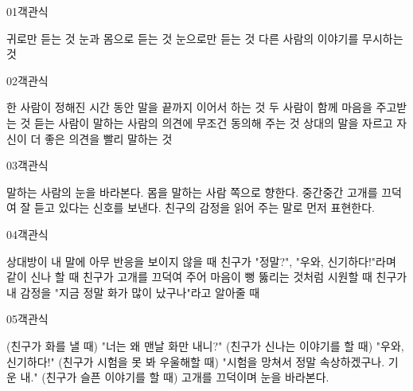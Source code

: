 \documentclass[fs12,seriesSau]{korfarm-base}
\begin{document}
\begin{kfQBlock}{01}{객관식}
\begin{kfChoices}
\kfChoice 귀로만 듣는 것
\kfChoice 눈과 몸으로 듣는 것
\kfChoice 눈으로만 듣는 것
\kfChoice 다른 사람의 이야기를 무시하는 것
\end{kfChoices}
\end{kfQBlock}
\begin{kfQBlock}{02}{객관식}
\begin{kfChoices}
\kfChoice 한 사람이 정해진 시간 동안 말을 끝까지 이어서 하는 것
\kfChoice 두 사람이 함께 마음을 주고받는 것
\kfChoice 듣는 사람이 말하는 사람의 의견에 무조건 동의해 주는 것
\kfChoice 상대의 말을 자르고 자신이 더 좋은 의견을 빨리 말하는 것
\end{kfChoices}
\end{kfQBlock}
\begin{kfQBlock}{03}{객관식}
\begin{kfChoices}
\kfChoice 말하는 사람의 눈을 바라본다.
\kfChoice 몸을 말하는 사람 쪽으로 향한다.
\kfChoice 중간중간 고개를 끄덕여 잘 듣고 있다는 신호를 보낸다.
\kfChoice 친구의 감정을 읽어 주는 말로 먼저 표현한다.
\end{kfChoices}
\end{kfQBlock}
\begin{kfQBlock}{04}{객관식}
\begin{kfChoices}
\kfChoice 상대방이 내 말에 아무 반응을 보이지 않을 때
\kfChoice 친구가 "정말?", "우와, 신기하다!"라며 같이 신나 할 때
\kfChoice 친구가 고개를 끄덕여 주어 마음이 뻥 뚫리는 것처럼 시원할 때
\kfChoice 친구가 내 감정을 "지금 정말 화가 많이 났구나"라고 알아줄 때
\end{kfChoices}
\end{kfQBlock}
\begin{kfQBlock}{05}{객관식}
\begin{kfChoices}
\kfChoice (친구가 화를 낼 때) "너는 왜 맨날 화만 내니?"
\kfChoice (친구가 신나는 이야기를 할 때) "우와, 신기하다!"
\kfChoice (친구가 시험을 못 봐 우울해할 때) "시험을 망쳐서 정말 속상하겠구나. 기운 내."
\kfChoice (친구가 슬픈 이야기를 할 때) 고개를 끄덕이며 눈을 바라본다.
\end{kfChoices}
\end{kfQBlock}
\end{document}
